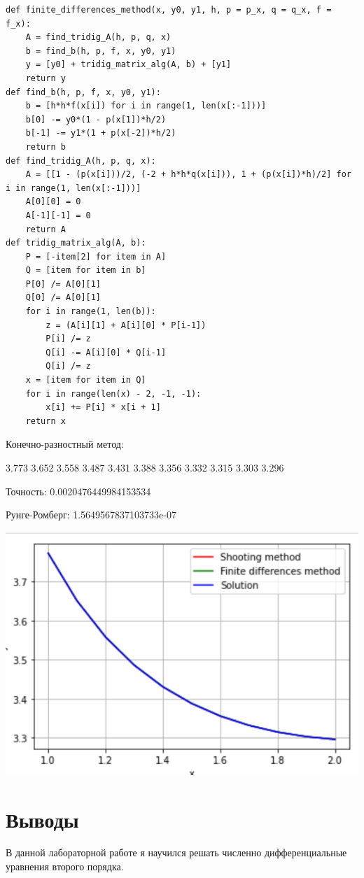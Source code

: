 \documentclass[pdf, unicode, 12pt, a4paper,oneside,fleqn]{article}
\begin{document}
\begin{lstlisting}
def finite_differences_method(x, y0, y1, h, p = p_x, q = q_x, f = f_x):
    A = find_tridig_A(h, p, q, x)
    b = find_b(h, p, f, x, y0, y1)
    y = [y0] + tridig_matrix_alg(A, b) + [y1]
    return y
def find_b(h, p, f, x, y0, y1):
    b = [h*h*f(x[i]) for i in range(1, len(x[:-1]))]
    b[0] -= y0*(1 - p(x[1])*h/2)
    b[-1] -= y1*(1 + p(x[-2])*h/2)
    return b
def find_tridig_A(h, p, q, x):
    A = [[1 - (p(x[i]))/2, (-2 + h*h*q(x[i])), 1 + (p(x[i])*h)/2] for i in range(1, len(x[:-1]))]
    A[0][0] = 0
    A[-1][-1] = 0
    return A
def tridig_matrix_alg(A, b):
    P = [-item[2] for item in A]
    Q = [item for item in b]
    P[0] /= A[0][1]
    Q[0] /= A[0][1]
    for i in range(1, len(b)):
        z = (A[i][1] + A[i][0] * P[i-1])
        P[i] /= z
        Q[i] -= A[i][0] * Q[i-1]
        Q[i] /= z
    x = [item for item in Q]
    for i in range(len(x) - 2, -1, -1):
        x[i] += P[i] * x[i + 1]
    return x
\end{lstlisting}

Конечно-разностный метод:

3.773 3.652 3.558 3.487 3.431 3.388 3.356 3.332 3.315 3.303 3.296 

Точность: 0.0020476449984153534

Рунге-Ромберг: 1.5649567837103733e-07

\includegraphics[scale=0.45]{data4.png}

\section{Выводы}

В данной лабораторной работе я научился решать численно дифференциальные уравнения второго порядка.
\end{document}
